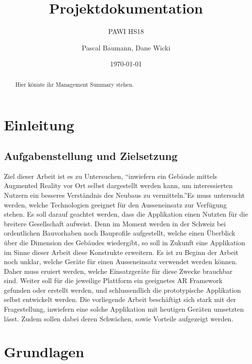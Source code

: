 \documentclass[a4paper]{scrreprt}
\title{Projektdokumentation}
\subtitle{PAWI HS18}
\author{Pascal Baumann, Dane Wicki}
\date{\today}
\begin{document}
\begin{titlepage}
\maketitle
\end{titlepage}

\renewcommand{\abstractname}{Management Summary}
\begin{abstract}
	Hier könnte ihr Management Summary stehen.
\end{abstract}

\tableofcontents

\clearpage
{}
\chapter{Einleitung}

\section{Aufgabenstellung und Zielsetzung}
Ziel dieser Arbeit ist es zu Untersuchen, \textquotedblleft inwiefern ein Gebäude mittels Augmented Reality vor Ort selbst dargestellt werden kann, um interessierten Nutzern ein besseres Verständnis des Neubaus zu vermitteln.\textquotedblright Es muss untersucht werden, welche Technologien geeignet für den Ausseneinsatz zur Verfügung stehen. Es soll darauf geachtet werden, dass die Applikation einen Nutzten für die breitere Gesellschaft aufweist. Denn im Moment werden in der Schweiz bei ordentlichen Bauvorhaben noch Bauprofile aufgestellt, welche einen Überblick über die Dimension des Gebäudes wiedergibt, so soll in Zukunft eine Applikation im Sinne dieser Arbeit diese Konstrukte erweitern.
\bigbreak
Es ist zu Beginn der Arbeit noch unklar, welche Geräte für einen Ausseneinsatz verwendet werden können. Daher muss eruiert werden, welche Einsatzgeräte für diese Zwecke brauchbar sind. Weiter soll für die jeweilige Plattform ein geeignetes AR Framework gefunden oder erstellt werden, und schlussendlich die prototypische Applikation selbst entwickelt werden.
\bigbreak
Die vorliegende Arbeit beschäftigt sich stark mit der Fragestellung, inwiefern eine solche Applikation mit heutigen Geräten umsetzten lässt. Zudem sollen dabei deren Schwächen, sowie Vorteile aufgezeigt werden.
\chapter{Grundlagen}
\label{ch:StandDerForschung}
\end{document}
